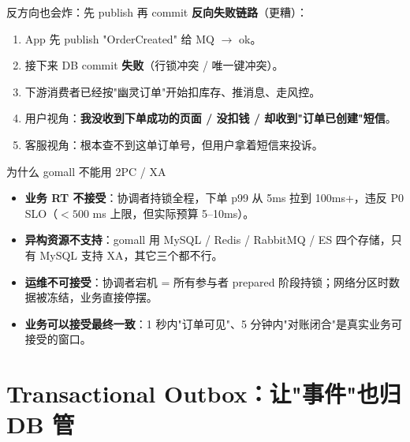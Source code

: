 \documentclass[aspectratio=169,11pt]{beamer}
\begin{document}
\begin{frame}[shrink]{反方向也会炸：先 publish 再 commit}
\textbf{反向失败链路}（更糟）：
\begin{enumerate}
  \item App 先 publish "OrderCreated" 给 MQ $\to$ ok。
  \item 接下来 DB commit \textbf{失败}（行锁冲突 / 唯一键冲突）。
  \item 下游消费者已经按"幽灵订单"开始扣库存、推消息、走风控。
  \item 用户视角：\textbf{我没收到下单成功的页面 / 没扣钱 / 却收到"订单已创建"短信}。
  \item 客服视角：根本查不到这单订单号，但用户拿着短信来投诉。
\end{enumerate}
\vspace{2mm}
\end{frame}

\begin{frame}[shrink]{为什么 gomall 不能用 2PC / XA}
\begin{itemize}
  \item \textbf{业务 RT 不接受}：协调者持锁全程，下单 p99 从 5ms 拉到 100ms+，违反 P0 SLO（$< 500$ ms 上限，但实际预算 5--10ms）。
  \item \textbf{异构资源不支持}：gomall 用 MySQL / Redis / RabbitMQ / ES 四个存储，只有 MySQL 支持 XA，其它三个都不行。
  \item \textbf{运维不可接受}：协调者宕机 = 所有参与者 prepared 阶段持锁；网络分区时数据被冻结，业务直接停摆。
  \item \textbf{业务可以接受最终一致}：1 秒内"订单可见"、5 分钟内"对账闭合"是真实业务可接受的窗口。
\end{itemize}
\vspace{1mm}
\end{frame}

\section{Transactional Outbox：让"事件"也归 DB 管}
\end{document}
